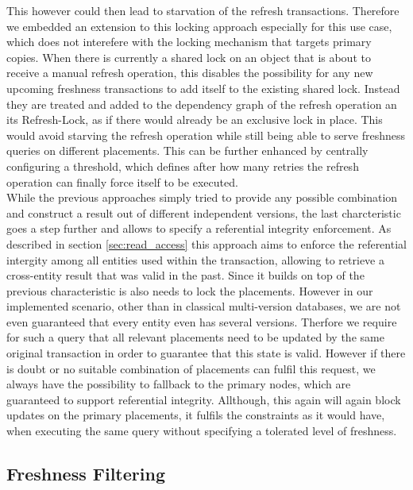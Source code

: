 This however could then lead to starvation of the refresh transactions. 
Therefore we embedded an extension to this locking approach especially for this use case, which does not interefere with 
the locking mechanism that targets primary copies. When there is currently a shared lock on an object that is about to receive a manual refresh operation, 
this disables the possibility for any new upcoming freshness transactions to add itself to the existing shared lock. Instead they are treated and added to the dependency graph 
of the refresh operation an its Refresh-Lock, as if there would already be an exclusive lock in place. 
This would avoid starving the refresh operation while still being able to serve freshness queries on different placements.
This can be further enhanced by centrally configuring a threshold, which defines after how many retries the refresh operation can finally force itself 
to be executed.\\
While the previous approaches simply tried to provide any possible combination
and construct a result out of different independent versions, the last charcteristic goes a step further and allows to specify a referential integrity enforcement. 
As described in section \ref{sec:read_access} this approach aims to enforce the referential intergity among all entities used within the transaction, 
allowing to retrieve a cross-entity result that was valid in the past. Since it builds on top of the previous characteristic is also needs to lock the placements. 
However in our implemented scenario, other than in classical multi-version databases, we are not even guaranteed that every entity even has several versions. 
Therfore we require for such a query that all relevant placements need to be updated by the same original transaction in order to guarantee that this state is valid.
However if there is doubt or no suitable combination of placements can fulfil this request,
we always have the possibility to fallback to the primary nodes, which are guaranteed to support referential integrity.
Allthough, this again will again block updates on the primary placements, it fulfils the constraints as it would have, when executing the same query without specifying a tolerated level of freshness.






\subsection{Freshness Filtering}
\label{sec:fresh_filter} 


